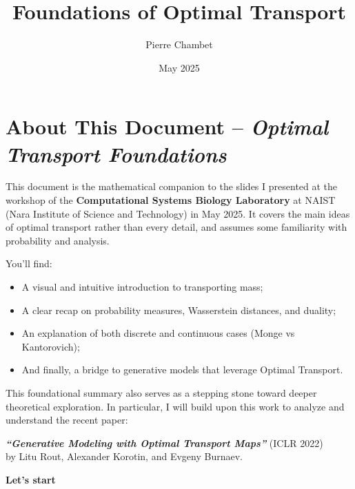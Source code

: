 \documentclass[11pt]{article}
\title{\Huge Foundations of Optimal Transport}
\author{Pierre Chambet}
\date{May 2025}
\begin{document}
\maketitle

\section*{About This Document – \textit{Optimal Transport Foundations}}

\vspace{1em}

This document is the mathematical companion to the slides I presented at the workshop of the \textbf{Computational Systems Biology Laboratory} at NAIST (Nara Institute of Science and Technology) in May 2025. It covers the main ideas of optimal transport rather than every detail, and assumes some familiarity with probability and analysis.

\vspace{1em}


You’ll find:
\begin{itemize}
  \item A visual and intuitive introduction to transporting mass;
  \item A clear recap on probability measures, Wasserstein distances, and duality;
  \item An explanation of both discrete and continuous cases (Monge vs Kantorovich);
  \item And finally, a bridge to generative models that leverage Optimal Transport.
\end{itemize}

\vspace{1em}

This foundational summary also serves as a stepping stone toward deeper theoretical exploration.  
In particular, I will build upon this work to analyze and understand the recent paper:

\begin{center}
\textbf{\textit{“Generative Modeling with Optimal Transport Maps”}} (ICLR 2022)\\
by Litu Rout, Alexander Korotin, and Evgeny Burnaev.
\end{center}

\vspace{1em}


\begin{highlight}
    \begin{center}
       \textbf{Let's start} 
    \end{center}
\end{highlight}
\end{document}
